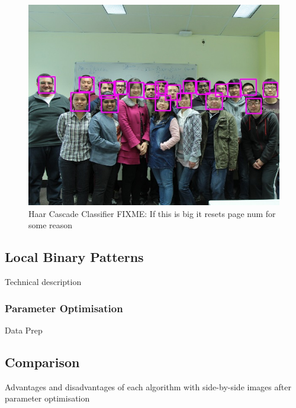 \documentclass{article}
\begin{document}
\begin{figure}
\centering
\includegraphics[scale=1]{waiting_room_detected.jpg}
\caption{Haar Cascade Classifier FIXME: If this is big it resets page num for some reason}
\label{fig:haar_cascade}
\end{figure}



\subsection{Local Binary Patterns}
Technical description
\subsubsection{Parameter Optimisation}
Data Prep

\subsection{Comparison}
Advantages and disadvantages of each algorithm with side-by-side images after parameter optimisation
\end{document}
